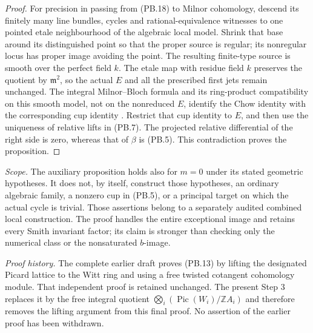\begin{proof}
For precision in passing from (PB.18) to Milnor cohomology, descend
its finitely many line bundles, cycles and rational-equivalence
witnesses to one pointed etale neighbourhood of the algebraic local
model. Shrink that base around its distinguished point so that the
proper source is regular; its nonregular locus has proper image
avoiding the point. The resulting finite-type source is smooth
over the perfect field $k$. The etale map with residue field $k$
preserves the quotient by $\mathfrak m^2$, so the actual $E$ and all
the prescribed first jets remain unchanged. The integral
Milnor--Bloch formula and its ring-product compatibility on this
smooth model, not on the nonreduced $E$, identify the Chow identity
with the corresponding cup identity
\citep[Theorems 7.1 and 7.5, author pp.~21--22]{cyKerz2009Milnor}
\citep[Section 3, diagram (22), pp.~557--558]{cyBraunling2013}.
Restrict that cup identity to $E$, and then use the uniqueness of
relative lifts in (PB.7). The projected relative differential of
the right side is zero, whereas that of $\beta$ is (PB.5).
This contradiction proves the proposition.
\end{proof}

\noindent\emph{Scope.}
The auxiliary proposition holds also for $m=0$ under its stated
geometric hypotheses. It does not, by itself, construct those
hypotheses, an ordinary algebraic family, a nonzero cup in (PB.5),
or a principal target on which the actual cycle is trivial.
Those assertions belong to a separately audited combined local
construction. The proof handles the entire exceptional image and
retains every Smith invariant factor; its claim is stronger than
checking only the numerical class or the nonsaturated $b$-image.


\noindent\emph{Proof history.}
The complete earlier draft proves (PB.13) by lifting the designated
Picard lattice to the Witt ring and using a free twisted cotangent
cohomology module. That independent proof is retained unchanged.
The present Step 3 replaces it by the free integral quotient
$\bigotimes_i(\operatorname{Pic}(W_i)/\mathbb ZA_i)$ and therefore
removes the lifting argument from this final proof. No assertion
of the earlier proof has been withdrawn.
